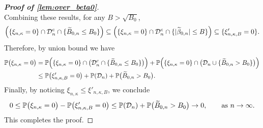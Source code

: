 \begin{proof}[\textbf{Proof of \cref{lem:over_beta0}}]
~\\
\noindent
Combining these results, for any $B > \sqrt{B_0}$,
\begin{equation*}
    \left( \{ \xi_{n,\kappa} = 0 \} \cap \mathcal{D}_n^c \cap \{ \widetilde B_{0, n} \le  B_{0} \} \right) 
    \subseteq
    \left( \{ \xi_{n,\kappa} = 0 \} \cap \mathcal{D}_n^c \cap \{ | \widetilde\beta_{0, n} | \le B \} \right) 
    \subseteq
    \{ \xi'_{n,\kappa,B} = 0 \}.
\end{equation*}
Therefore, by union bound we have
\begin{equation*}
    \begin{aligned}
        \mathbb{P}\bigl(\xi_{n,\kappa} = 0\bigr) 
        & = \mathbb{P}\Bigl( \{ \xi_{n,\kappa} = 0 \} \cap 
        \bigl( \mathcal{D}_n^c \cap \{ \widetilde B_{0, n} \le  B_{0} \} \bigr)
         \Bigr)
         +
         \mathbb{P}\Bigl( \{ \xi_{n,\kappa} = 0 \} \cap 
        \bigl( \mathcal{D}_n \cup \{ \widetilde B_{0, n} >  B_{0} \} \bigr)
         \Bigr)
         \\
        & \le \mathbb{P}\bigl(\xi'_{n,\kappa,B} = 0\bigr) + \mathbb{P}(\mathcal{D}_n) + \mathbb{P}\bigl(\widetilde B_{0, n} > B_0\bigr).
    \end{aligned}
\end{equation*}
Finally, by noticing $\xi_{n,\kappa} \le \xi'_{n,\kappa,B}$, we conclude
\begin{equation*}
    0 \le \mathbb{P}\bigl(\xi_{n,\kappa} = 0\bigr) - \mathbb{P}\bigl(\xi'_{n,\kappa,B} = 0\bigr) \le 
    \mathbb{P}(\mathcal{D}_n) + \mathbb{P}\bigl(\widetilde B_{0, n} > B_0\bigr) \to 0,
    \qquad \text{as $n \to \infty$}.
\end{equation*}
This completes the proof.
\end{proof}














